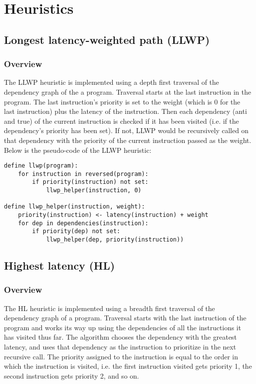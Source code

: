 \documentclass{article}
\begin{document}
\section{Heuristics}
\subsection{Longest latency-weighted path (LLWP)}
\subsubsection{Overview}
The LLWP heuristic is implemented using a depth first traversal of the dependency graph of the a program. Traversal starts at the last instruction in the program. The last instruction's priority is set to the weight (which is 0 for the last instruction) plus the latency of the instruction. Then each dependency (anti and true) of the current instruction is checked if it has been visited (i.e. if the dependency's priority has been set). If not, LLWP would be recursively called on that dependency with the priority of the current instruction passed as the weight. Below is the pseudo-code of the LLWP heuristic:
\begin{verbatim}
define llwp(program):
    for instruction in reversed(program):
        if priority(instruction) not set:
            llwp_helper(instruction, 0)
    
define llwp_helper(instruction, weight):
    priority(instruction) <- latency(instruction) + weight
    for dep in dependencies(instruction):
        if priority(dep) not set:
            llwp_helper(dep, priority(instruction))
\end{verbatim}
\subsection{Highest latency (HL)}
\subsubsection{Overview}
The HL heuristic is implemented using a breadth first traversal of the dependency graph of a program. Traversal starts with the last instruction of the program and works its way up using the dependencies of all the instructions it has visited thus far. The algorithm chooses the dependency with the greatest latency, and uses that dependency as the instruction to prioritize in the next recursive call. The priority assigned to the instruction is equal to the order in which the instruction is visited, i.e. the first instruction visited gets priority 1, the second instruction gets priority 2, and so on. 
\end{document}
